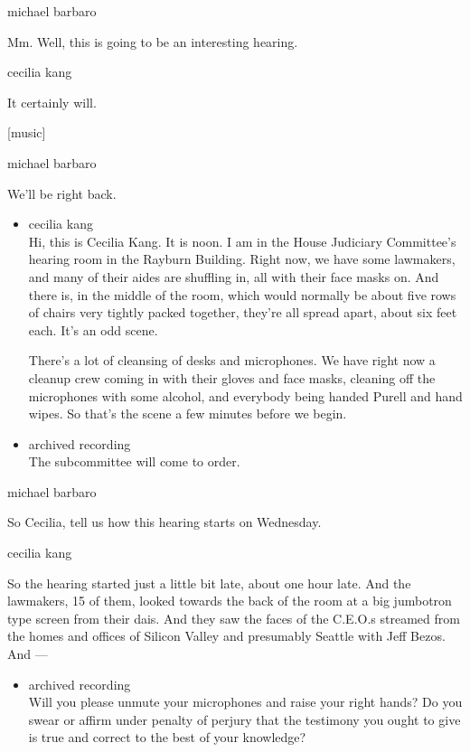 michael barbaro

Mm. Well, this is going to be an interesting hearing.

cecilia kang

It certainly will.

{[}music{]}

michael barbaro

We'll be right back.

\begin{itemize}
\item
  cecilia kang\\
  Hi, this is Cecilia Kang. It is noon. I am in the House Judiciary
  Committee's hearing room in the Rayburn Building. Right now, we have
  some lawmakers, and many of their aides are shuffling in, all with
  their face masks on. And there is, in the middle of the room, which
  would normally be about five rows of chairs very tightly packed
  together, they're all spread apart, about six feet each. It's an odd
  scene.

  There's a lot of cleansing of desks and microphones. We have right now
  a cleanup crew coming in with their gloves and face masks, cleaning
  off the microphones with some alcohol, and everybody being handed
  Purell and hand wipes. So that's the scene a few minutes before we
  begin.
\item
  archived recording\\
  The subcommittee will come to order.
\end{itemize}

michael barbaro

So Cecilia, tell us how this hearing starts on Wednesday.

cecilia kang

So the hearing started just a little bit late, about one hour late. And
the lawmakers, 15 of them, looked towards the back of the room at a big
jumbotron type screen from their dais. And they saw the faces of the
C.E.O.s streamed from the homes and offices of Silicon Valley and
presumably Seattle with Jeff Bezos. And ---

\begin{itemize}
\tightlist
\item
  archived recording\\
  Will you please unmute your microphones and raise your right hands? Do
  you swear or affirm under penalty of perjury that the testimony you
  ought to give is true and correct to the best of your knowledge?
\end{itemize}


